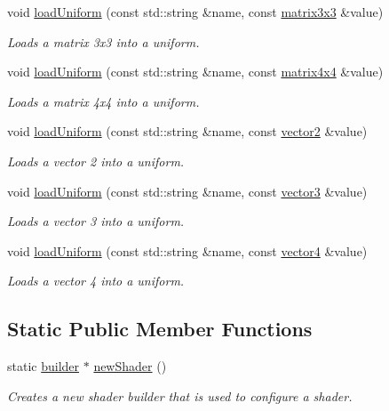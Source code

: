 \begin{DoxyCompactItemize}
void \hyperlink{classflounder_1_1shader_a9122d8bd4e63275b640e43d04f75fa88}{load\+Uniform} (const std\+::string \&name, const \hyperlink{classflounder_1_1matrix3x3}{matrix3x3} \&value)
\begin{DoxyCompactList}\small\item\em Loads a matrix 3x3 into a uniform. \end{DoxyCompactList}\item 
void \hyperlink{classflounder_1_1shader_a2b7d1b32758e0aaefd20b050aeb2e7fe}{load\+Uniform} (const std\+::string \&name, const \hyperlink{classflounder_1_1matrix4x4}{matrix4x4} \&value)
\begin{DoxyCompactList}\small\item\em Loads a matrix 4x4 into a uniform. \end{DoxyCompactList}\item 
void \hyperlink{classflounder_1_1shader_a38aea3f31eb3f4b202bb9b519966c073}{load\+Uniform} (const std\+::string \&name, const \hyperlink{classflounder_1_1vector2}{vector2} \&value)
\begin{DoxyCompactList}\small\item\em Loads a vector 2 into a uniform. \end{DoxyCompactList}\item 
void \hyperlink{classflounder_1_1shader_a776ea14c9ec0e66b59e25cdc606e5bc8}{load\+Uniform} (const std\+::string \&name, const \hyperlink{classflounder_1_1vector3}{vector3} \&value)
\begin{DoxyCompactList}\small\item\em Loads a vector 3 into a uniform. \end{DoxyCompactList}\item 
void \hyperlink{classflounder_1_1shader_aa56085c5c7dc315f165ee3bb9d81d250}{load\+Uniform} (const std\+::string \&name, const \hyperlink{classflounder_1_1vector4}{vector4} \&value)
\begin{DoxyCompactList}\small\item\em Loads a vector 4 into a uniform. \end{DoxyCompactList}\end{DoxyCompactItemize}
\subsection*{Static Public Member Functions}
\begin{DoxyCompactItemize}
\item 
static \hyperlink{classflounder_1_1shader_1_1builder}{builder} $\ast$ \hyperlink{classflounder_1_1shader_a3dbe598a9994e8e4ccbf889ba38b05f7}{new\+Shader} ()
\begin{DoxyCompactList}\small\item\em Creates a new shader builder that is used to configure a shader. \end{DoxyCompactList}\end{DoxyCompactItemize}
